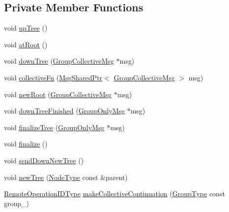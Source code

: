 \subsection*{Private Member Functions}
\begin{DoxyCompactItemize}
\item 
void \hyperlink{structvt_1_1group_1_1_info_coll_a74f2c524bbd2e2b07207420e70e347d7}{up\+Tree} ()
\item 
void \hyperlink{structvt_1_1group_1_1_info_coll_a04b8c9b9339fb348bf869dab130280eb}{at\+Root} ()
\item 
void \hyperlink{structvt_1_1group_1_1_info_coll_af0b3b5babeed07eab4d462a0adf5fe2b}{down\+Tree} (\hyperlink{namespacevt_1_1group_a4c1183efe0185992fefb3ab38a55a8a7}{Group\+Collective\+Msg} $\ast$msg)
\item 
void \hyperlink{structvt_1_1group_1_1_info_coll_a0064a94b70d12132ed580f4a92111f47}{collective\+Fn} (\hyperlink{namespacevt_ab2b3d506ec8e8d1540aede826d84a239}{Msg\+Shared\+Ptr}$<$ \hyperlink{namespacevt_1_1group_a4c1183efe0185992fefb3ab38a55a8a7}{Group\+Collective\+Msg} $>$ msg)
\item 
void \hyperlink{structvt_1_1group_1_1_info_coll_a9d6575ca76673103be0c4960c818a892}{new\+Root} (\hyperlink{namespacevt_1_1group_a4c1183efe0185992fefb3ab38a55a8a7}{Group\+Collective\+Msg} $\ast$msg)
\item 
void \hyperlink{structvt_1_1group_1_1_info_coll_a0111e7d7705e380ed37ccd15d5fb434d}{down\+Tree\+Finished} (\hyperlink{namespacevt_1_1group_a864fcf6bc821eacf8350bf4ad15e51b3}{Group\+Only\+Msg} $\ast$msg)
\item 
void \hyperlink{structvt_1_1group_1_1_info_coll_a14d7b768d923e1f23e8c5771422ddc2c}{finalize\+Tree} (\hyperlink{namespacevt_1_1group_a864fcf6bc821eacf8350bf4ad15e51b3}{Group\+Only\+Msg} $\ast$msg)
\item 
void \hyperlink{structvt_1_1group_1_1_info_coll_a2ab985f82ec448b1e9e3b86fcb80f071}{finalize} ()
\item 
void \hyperlink{structvt_1_1group_1_1_info_coll_a5c246c121f366c2d20df42cb85087f7c}{send\+Down\+New\+Tree} ()
\item 
void \hyperlink{structvt_1_1group_1_1_info_coll_aea685940e7c9f1e18d55bfab07e31445}{new\+Tree} (\hyperlink{namespacevt_a866da9d0efc19c0a1ce79e9e492f47e2}{Node\+Type} const \&parent)
\item 
\hyperlink{namespacevt_1_1group_a73f2624ddeb535b39a08b6524f26b244}{Remote\+Operation\+I\+D\+Type} \hyperlink{structvt_1_1group_1_1_info_coll_a1272a60bb7397d4434e16d6d02b7506e}{make\+Collective\+Continuation} (\hyperlink{namespacevt_a27b5e4411c9b6140c49100e050e2f743}{Group\+Type} const group\+\_\+)
\end{DoxyCompactItemize}
